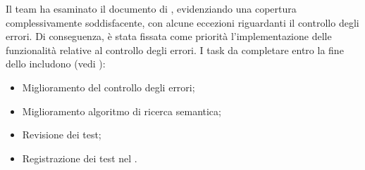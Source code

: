 \vspace{0.5\baselineskip}
\par Il team ha esaminato il documento di \AdR, evidenziando una copertura complessivamente soddisfacente, con alcune eccezioni riguardanti il controllo degli errori. Di conseguenza, è stata fissata come priorità l'implementazione delle funzionalità relative al controllo degli errori. I task da completare entro la fine dello  includono (vedi ):
\begin{itemize}
	\item Miglioramento del controllo degli errori;
	\item Miglioramento algoritmo di ricerca semantica;
	\item Revisione dei test;
	\item Registrazione dei test nel \PdQ.
\end{itemize}
